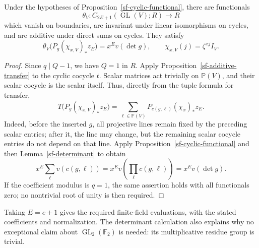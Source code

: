 \begin{theorem}\label{sf-functional}
Under the hypotheses of Proposition~\ref{sf-cyclic-functional},
there are functionals
\[
             \theta_V:C_{2E+1}(\operatorname{GL}(V);R)\to R
\]
which vanish on boundaries, are invariant under
linear isomorphisms on cycles, and are additive
under direct sums on cycles.  They satisfy
\[
 \theta_V\bigl(P_g(\chi_{x,V})_*z_E\bigr)
                         =x^E v(\det g),
 \qquad
 \chi_{x,V}(j)=\zeta^{xj}I_V.
\]
\end{theorem}
\begin{proof}
Since \(q\mid Q-1\), we have \(Q=1\) in \(R\).
Apply Proposition~\ref{sf-additive-transfer} to the
cyclic cocycle \(t\).
Scalar matrices act trivially on \(\mathbb P(V)\),
and their scalar cocycle is the scalar itself.
Thus, directly from the tuple formula for transfer,
\[
 T\bigl(P_g(\chi_{x,V})_*z_E\bigr)
     =\sum_{\ell\in\mathbb P(V)}
          P_{c(g,\ell)}(\chi_x)_*z_E.
\]
Indeed, before the inserted \(g\), all projective
lines remain fixed by the preceding scalar entries;
after it, the line may change, but the remaining
scalar cocycle entries do not depend on that line.
Apply Proposition~\ref{sf-cyclic-functional} and then
Lemma~\ref{sf-determinant} to obtain
\[
 x^E\sum_\ell v(c(g,\ell))
       =x^E v\!\left(\prod_\ell c(g,\ell)\right)
       =x^E v(\det g).
\]
If the coefficient modulus is \(q=1\), the same
assertion holds with all functionals zero; no
nontrivial root of unity is then required.
\end{proof}

Taking \(E=e+1\) gives the required finite-field evaluations,
with the stated coefficients and normalization.  The determinant calculation also
explains why no exceptional claim about
\(\operatorname{GL}_2(\mathbb F_2)\) is needed:
its multiplicative residue group is trivial.


